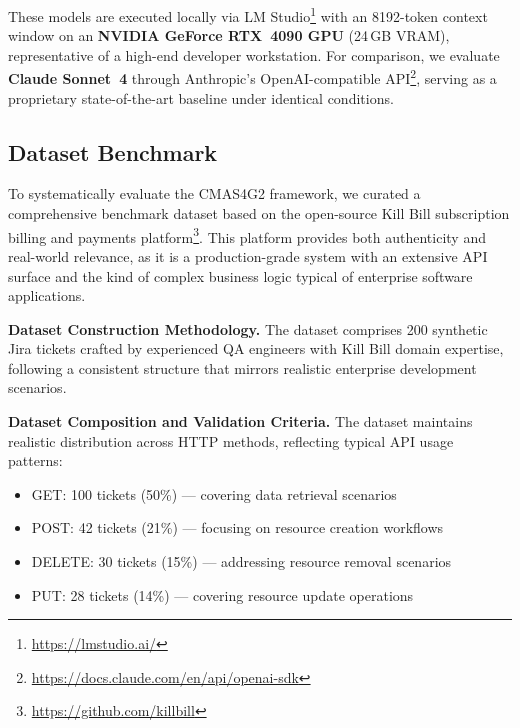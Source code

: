 \documentclass[runningheads]{llncs}
\begin{document}
These models are executed locally via LM Studio\footnote{\url{https://lmstudio.ai/}} with an 8192-token context window on an \textbf{NVIDIA GeForce RTX~4090 GPU} (24\,GB VRAM), representative of a high-end developer workstation.
For comparison, we evaluate \textbf{Claude Sonnet~4} through Anthropic's OpenAI-compatible API\footnote{\url{https://docs.claude.com/en/api/openai-sdk}}, serving as a proprietary state-of-the-art baseline under identical conditions.

\subsection{Dataset Benchmark}
To systematically evaluate the CMAS4G2 framework, we curated a comprehensive benchmark dataset based on the open-source Kill Bill subscription billing and payments platform\footnote{\url{https://github.com/killbill}}. This platform provides both authenticity and real-world relevance, as it is a production-grade system with an extensive API surface and the kind of complex business logic typical of enterprise software applications.

\noindent \textbf{Dataset Construction Methodology.}
The dataset comprises 200 synthetic Jira tickets crafted by experienced QA engineers with Kill Bill domain expertise, following a consistent structure that mirrors realistic enterprise development scenarios.

\noindent \textbf{Dataset Composition and Validation Criteria.}
The dataset maintains realistic distribution across HTTP methods, reflecting typical API usage patterns:
\begin{itemize}
\item GET: 100 tickets (50\%) --- covering data retrieval scenarios
\item POST: 42 tickets (21\%) --- focusing on resource creation workflows
\item DELETE: 30 tickets (15\%) --- addressing resource removal scenarios
\item PUT: 28 tickets (14\%) --- covering resource update operations
\end{itemize}
\end{document}
